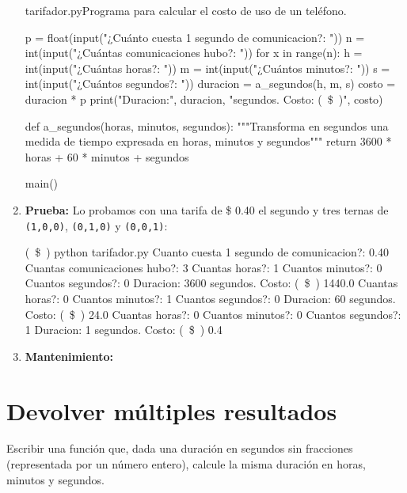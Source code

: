 \begin{solucion}
\begin{enumerate}
\begin{codigo}{\label{tarifador} tarifador.py}{Programa para calcular el costo
    de uso de un teléfono.}
\begin{codigo-python}
    p = float(input("¿Cuánto cuesta 1 segundo de comunicacion?: "))
    n = int(input("¿Cuántas comunicaciones hubo?: "))
    for x in range(n):
        h = int(input("¿Cuántas horas?: "))
        m = int(input("¿Cuántos minutos?: "))
        s = int(input("¿Cuántos segundos?: "))
        duracion = a_segundos(h, m, s)
        costo = duracion * p
        print("Duracion:", duracion, "segundos. Costo: (~\$~)", costo)

def a_segundos(horas, minutos, segundos):
    """Transforma en segundos una medida de tiempo expresada en
       horas, minutos y segundos"""
	return 3600 * horas + 60 * minutos + segundos

main()
\end{codigo-python}
\end{codigo}

\item {\bf Prueba:} Lo probamos con una tarifa de \$ 0.40 el segundo y tres
ternas de \lstinline!(1,0,0)!, \lstinline!(0,1,0)! y \lstinline!(0,0,1)!:

\begin{codigo-nohl-sn}
(~\$~) python tarifador.py
Cuanto cuesta 1 segundo de comunicacion?: 0.40
Cuantas comunicaciones hubo?: 3
Cuantas horas?: 1
Cuantos minutos?: 0
Cuantos segundos?: 0
Duracion: 3600 segundos. Costo: (~\$~) 1440.0
Cuantas horas?: 0
Cuantos minutos?: 1
Cuantos segundos?: 0
Duracion: 60 segundos. Costo: (~\$~) 24.0
Cuantas horas?: 0
Cuantos minutos?: 0
Cuantos segundos?: 1
Duracion: 1 segundos. Costo: (~\$~) 0.4
\end{codigo-nohl-sn}

\item {\bf Mantenimiento:}

\end{enumerate}
\end{solucion}

\section{Devolver múltiples resultados}
\label{fun:multiple_return}

\begin{problemac}
Escribir una función que, dada una duración en segundos sin fracciones
(representada por un número entero), calcule la misma duración en horas,
minutos y segundos.
\end{problemac}

